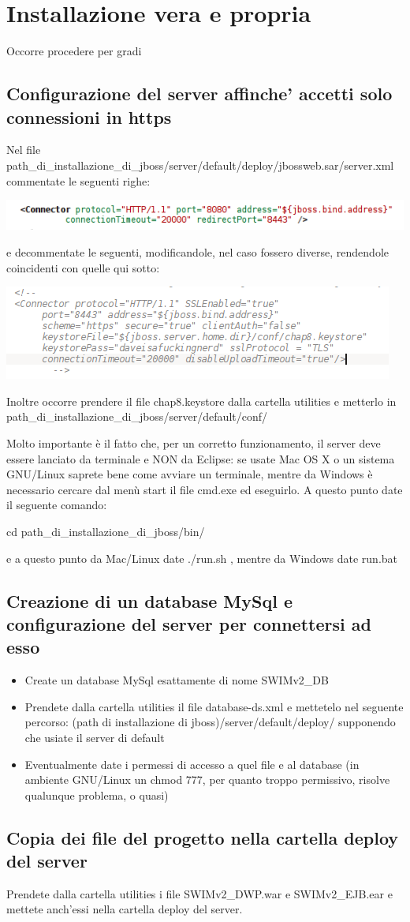 \documentclass[a4paper,12pt]{article}
\begin{document}
\section{Installazione vera e propria}
Occorre procedere per gradi

\subsection{Configurazione del server affinche' accetti solo connessioni in https}
Nel file path\_di\_installazione\_di\_jboss/server/default/deploy/jbossweb.sar/server.xml  commentate le seguenti righe:

\includegraphics[scale=0.8]{linestocomment}

e decommentate le seguenti, modificandole, nel caso fossero diverse, rendendole coincidenti con quelle qui sotto:

\includegraphics[scale=0.8]{linestouncomment}

Inoltre occorre prendere il file chap8.keystore dalla cartella utilities e metterlo in  path\_di\_installazione\_di\_jboss/server/default/conf/

Molto importante è il fatto che, per un corretto funzionamento, il server deve essere lanciato da terminale e NON da Eclipse: se usate Mac OS X o un sistema GNU/Linux saprete bene
come avviare un terminale, mentre da Windows è necessario cercare dal menù start il file cmd.exe ed eseguirlo. A questo punto date il seguente comando:

cd path\_di\_installazione\_di\_jboss/bin/

e a questo punto da Mac/Linux date ./run.sh , mentre da Windows date run.bat

\subsection{Creazione di un database MySql e configurazione del server per connettersi ad esso}
\begin{itemize}
 \item Create un database MySql esattamente di nome SWIMv2\_DB
 \item Prendete dalla cartella utilities il file database-ds.xml e mettetelo nel seguente percorso: (path di installazione di jboss)/server/default/deploy/   supponendo che usiate il
 server di default
 \item Eventualmente date i permessi di accesso a quel file e al database (in ambiente GNU/Linux un chmod 777, per quanto troppo permissivo, risolve qualunque problema, o quasi)
\end{itemize}

\subsection{Copia dei file del progetto nella cartella deploy del server}
Prendete dalla cartella utilities i file SWIMv2\_DWP.war e SWIMv2\_EJB.ear e mettete anch'essi nella cartella deploy del server.
\end{document}
